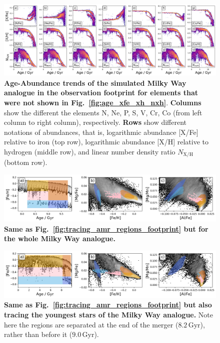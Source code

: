 \documentclass[fleqn,usenatbib]{mnras}
\begin{document}
\begin{figure}
	\includegraphics[width=\textwidth]{figures/age_xfe_xh_nxh_others.png}
    \caption{
    \textbf{Age-Abundance trends of the simulated Milky Way analogue in the observation footprint for elements that were not shown in Fig.~\ref{fig:age_xfe_xh_nxh}}.
    \textbf{Columns} show the different the elements N, Ne, P, S, V, Cr, Co (from left column to right column), respectively.
    \textbf{Rows} show different notations of abundances, that is, logarithmic abundance {[X/Fe]} relative to iron (top row), logarithmic abundance {[X/H]} relative to hydrogen (middle row), and linear number density ratio {$N_\mathrm{X/H}$} (bottom row).
    }
    \label{fig:appendix_xfe_xh_nx}
\end{figure}

\begin{figure}
	\includegraphics[width=\textwidth]{figures/tracing_amr_regions_whole.png}
    \caption{
    \textbf{Same as Fig.~\ref{fig:tracing_amr_regions_footprint} but for the whole Milky Way analogue.}
    }
    \label{fig:tracing_amr_regions_whole}
\end{figure}

\begin{figure}
	\includegraphics[width=\textwidth]{figures/tracing_amr_regions_disk.png}
    \caption{
    \textbf{Same as Fig.~\ref{fig:tracing_amr_regions_footprint} but also tracing the youngest stars of the Milky Way analogue.} Note here the regions are separated at the end of the merger ($8.2\,\mathrm{Gyr}$), rather than before it ($9.0\,\mathrm{Gyr}$).
    }
    \label{fig:tracing_amr_regions_disk}
\end{figure}


\bsp	%
\label{lastpage}
\end{document}
